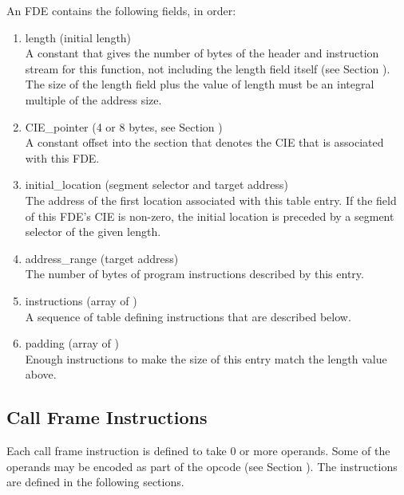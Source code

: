 An FDE contains the following fields, in order:
\begin{enumerate}[1. ]
\item length (initial length)  \\

A constant that gives the number of bytes of the header and
instruction stream for this function, not including the length
field itself 
(see Section  ). 
The size of the length field
plus the value of length must be an integral multiple of the
address size.

\item   CIE\_pointer (4 or 8 bytes, see Section ) \\
A constant 
offset into the 
section that denotes
the CIE that is associated with this FDE.

\item  initial\_location (segment selector and target address) \\
The 
address of the first location associated with this table
entry. 
If the  field of this FDE's CIE is non-zero,
the initial location is preceded by a segment selector of
the given length.

\item  address\_range (target address) \\
The 
number 
of bytes of program instructions described by this entry.

\item instructions (array of ) \\
A sequence of table defining instructions that are described below.

\item padding (array of ) \\
Enough  instructions 
to make the size of this entry match the length value above.
\end{enumerate}

\subsection{Call Frame Instructions}
\label{chap:callframeinstructions}

Each call frame instruction is defined to take 0 or more
operands. Some of the operands may be encoded as part of the
opcode 
(see Section ). 
The instructions are defined in
the following sections.

